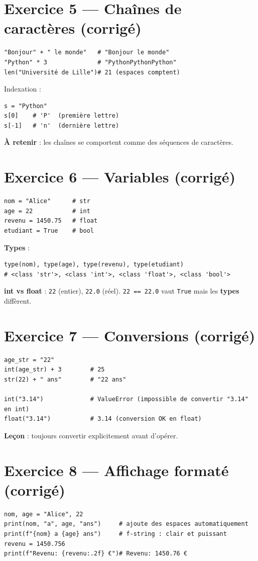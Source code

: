 \documentclass[11pt,a4paper]{article}
\begin{document}
\section*{Exercice 5 — Chaînes de caractères (corrigé)}
\begin{lstlisting}
"Bonjour" + " le monde"   # "Bonjour le monde"
"Python" * 3              # "PythonPythonPython"
len("Université de Lille")# 21 (espaces comptent)
\end{lstlisting}
Indexation :
\begin{lstlisting}
s = "Python"
s[0]    # 'P'  (première lettre)
s[-1]   # 'n'  (dernière lettre)
\end{lstlisting}
\textbf{À retenir} : les chaînes se comportent comme des séquences de caractères.

\section*{Exercice 6 — Variables (corrigé)}
\begin{lstlisting}
nom = "Alice"      # str
age = 22           # int
revenu = 1450.75   # float
etudiant = True    # bool
\end{lstlisting}
\textbf{Types} :
\begin{lstlisting}
type(nom), type(age), type(revenu), type(etudiant)
# <class 'str'>, <class 'int'>, <class 'float'>, <class 'bool'>
\end{lstlisting}
\textbf{int vs float} : \texttt{22} (entier), \texttt{22.0} (réel). \texttt{22 == 22.0} vaut \texttt{True} mais les \textbf{types} diffèrent.

\section*{Exercice 7 — Conversions (corrigé)}
\begin{lstlisting}
age_str = "22"
int(age_str) + 3        # 25
str(22) + " ans"        # "22 ans"

int("3.14")             # ValueError (impossible de convertir "3.14" en int)
float("3.14")           # 3.14 (conversion OK en float)
\end{lstlisting}
\textbf{Leçon} : toujours convertir explicitement avant d’opérer.

\section*{Exercice 8 — Affichage formaté (corrigé)}
\begin{lstlisting}
nom, age = "Alice", 22
print(nom, "a", age, "ans")     # ajoute des espaces automatiquement
print(f"{nom} a {age} ans")     # f-string : clair et puissant
revenu = 1450.756
print(f"Revenu: {revenu:.2f} €")# Revenu: 1450.76 €
\end{lstlisting}
\end{document}
